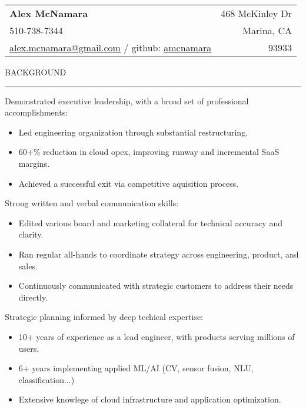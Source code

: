 \documentclass[12pt]{article}
\makeatletter
\newenvironment{justifycolumns}
{\begin{tabular*}{\textwidth}{@{\extracolsep{\fill}}lr@{}}}
{\end{tabular*}}
\newcommand{\row}[2]{#1 & #2 \\}
\newcommand{\blockseparation}{\vspace{0.13in}}
\newcommand{\heading}[1]{
	\vspace{0.05in}
	\uppercase{#1}
	\vspace{0.05in}
	\hrule
	\blockseparation
}
\newcommand{\bulletheading}[1]{
	\vspace{0.075in}
	\hspace{0.1in}
	{#1}
	\vspace{0.03in}
}
\newenvironment{tightbullets}
{\begin{itemize}}
{\end{itemize}}
\makeatother
\begin{document}
\begin{flushleft}

\begin{justifycolumns}
	\row{\Large\textbf{Alex McNamara}}{468 McKinley Dr}
	\row{510-738-7344}{Marina, CA}
	\row{
		\href{mailto:alex.mcnamara@gmail.com}{alex.mcnamara@gmail.com} / github: 
		\href{http://www.github.com/amcnamara}{amcnamara}
	}{93933}
\end{justifycolumns}
\vspace{0.175in}

\heading{Background}
\bulletheading{Demonstrated executive leadership, with a broad set of professional accomplishments:}
\begin{tightbullets}
	\item Led engineering organization through substantial restructuring.
	\item 60+\% reduction in cloud opex, improving runway and incremental SaaS margins.
	\item Achieved a successful exit via competitive aquisition process.
\end{tightbullets}

\bulletheading{Strong written and verbal communication skills:}
\begin{tightbullets}
	\item Edited various board and marketing collateral for technical accuracy and clarity.
	\item Ran regular all-hands to coordinate strategy across engineering, product, and sales.
	\item Continuously communicated with strategic customers to address their needs directly.
\end{tightbullets}

\bulletheading{Strategic planning informed by deep techical expertise:}
\begin{tightbullets}
	\item 10+ years of experience as a lead engineer, with products serving millions of users.
	\item 6+ years implementing applied ML/AI (CV, sensor fusion, NLU, classification...)
	\item Extensive knowlege of cloud infrastructure and application optimization.
\end{tightbullets}

\blockseparation


\end{flushleft}
\end{document}
